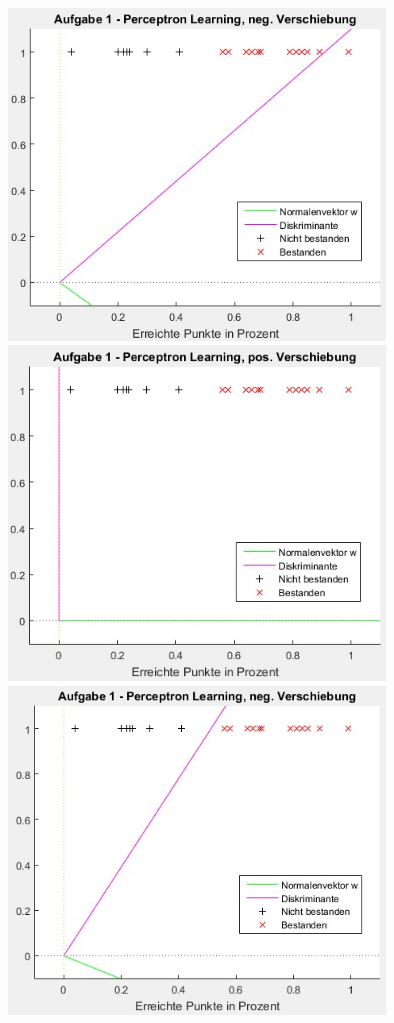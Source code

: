 \documentclass[12pt]{article}
\begin{document}
\begin{center}
\newpage
\includegraphics[width=10cm]{a1_07.jpg}\\
\includegraphics[width=10cm]{a1_08.jpg}
\newpage
\includegraphics[width=10cm]{a1_09.jpg}
\end{center}
\end{document}
